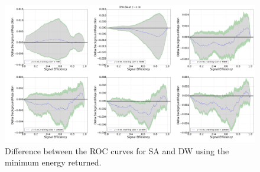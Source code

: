 \documentclass[.chapters/Higgs/.chapters/Higgs/main.tex]{subfiles}
\begin{document}
\begin{figure}[h]
\centering
\includegraphics[width=0.6\paperwidth]{chapters/Higgs/DW--SA_GS}
\caption{Difference between the ROC curves for SA and DW using the minimum energy returned.}
\label{fig:SA_DW_GS_droc}
\end{figure}
\end{document}
